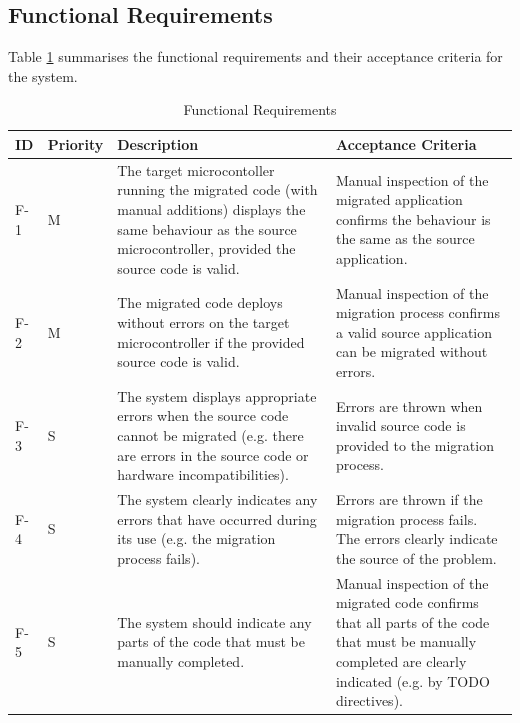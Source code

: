 \documentclass{UoYCSproject}
\newcommand{\ra}[1]{\renewcommand{\arraystretch}{#1}}
\begin{document}
\subsection{Functional Requirements}
Table \ref{table:func_req} summarises the functional requirements and their acceptance criteria for the system.
\begin{table}[h!]\centering
\caption{Functional Requirements}
\ra{1.3}
  \begin{tabular}{@{}p{}p{}p{}p{}@{}} \toprule 
  \textbf{ID} & \textbf{Priority} & \textbf{Description} & \textbf{Acceptance Criteria} \\
  \midrule
  F-1 & M & The target microcontoller running the migrated code (with manual additions) displays the same behaviour as the source microcontroller, provided the source code is valid. & Manual inspection of the migrated application confirms the behaviour is the same as the source application. \\
  F-2 & M & The migrated code deploys without errors on the target microcontroller if the provided source code is valid. & Manual inspection of the migration process confirms a valid source application can be migrated without errors. \\
  F-3 & S & The system displays appropriate errors when the source code cannot be migrated (e.g. there are errors in the source code or hardware incompatibilities). & Errors are thrown when invalid source code is provided to the migration process. \\  
  F-4 & S & The system clearly indicates any errors that have occurred during its use (e.g. the migration process fails). & Errors are thrown if the migration process fails. The errors clearly indicate the source of the problem. \\
  F-5 & S & The system should indicate any parts of the code that must be manually completed. & Manual inspection of the migrated code confirms that all parts of the code that must be manually completed are clearly indicated (e.g. by TODO directives). \\
  \bottomrule
  \end{tabular}
\label{table:func_req}
\end{table}
\end{document}
